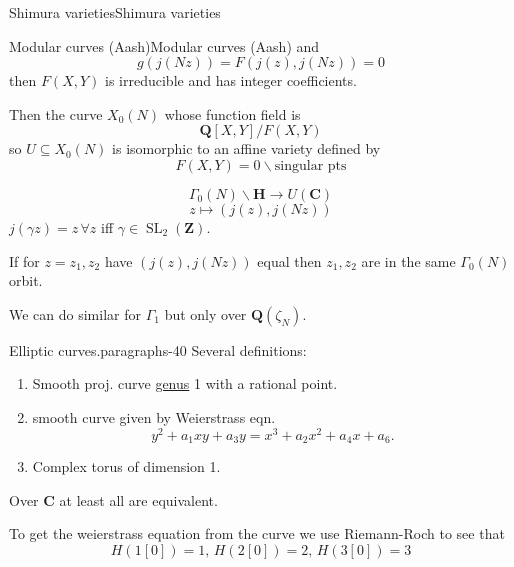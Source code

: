 \documentclass[10pt,]{book}
\numberwithin{equation}{section}
\newcommand{\lb}{[}
\newcommand{\rb}{]}
\newcommand{\ZZ}{\mathbf{Z}}
\newcommand{\QQ}{\mathbf{Q}}
\newcommand{\CC}{\mathbf{C}}
\newcommand{\HH}{\mathbf{H}}
\DeclareMathOperator{\SL}{SL}
\begin{document}
\begin{chapterptx}{Shimura varieties}{}{Shimura varieties}{}{}
\begin{sectionptx}{Modular curves (Aash)}{}{Modular curves (Aash)}{}{}
and%
\begin{equation*}
g (j(Nz)) = F(j(z), j(Nz)) = 0
\end{equation*}
then \(F(X,Y)\) is irreducible and  has integer coefficients.%
\par
\hypertarget{p-1043}{}%
Then the curve \(X_0(N)\) whose function field is%
\begin{equation*}
\QQ \lb X,Y\rb/ F(X,Y)
\end{equation*}
so \(U \subseteq X_0(N)\) is isomorphic to an affine variety defined by%
\begin{equation*}
F(X,Y) = 0 \smallsetminus \text{singular pts}
\end{equation*}
%
\par
\hypertarget{p-1044}{}%
%
\begin{equation*}
\Gamma_0(N) \backslash \HH \to U(\CC)
\end{equation*}
%
\begin{equation*}
z \mapsto (j(z), j(Nz))
\end{equation*}
\(j(\gamma z) = z\,\forall z\) iff \(\gamma \in \SL_2(\ZZ)\).%
\par
\hypertarget{p-1045}{}%
If for \(z= z_1,z_2\) have \((j(z),j(Nz))\) equal then \(z_1,z_2\) are in the same \(\Gamma_0(N)\) orbit.%
\par
\hypertarget{p-1046}{}%
We can do similar for \(\Gamma_1\) but only over \(\QQ(\zeta_N)\).%
\begin{paragraphs}{Elliptic curves.}{paragraphs-40}%
\hypertarget{p-1047}{}%
Several definitions:\leavevmode%
\begin{enumerate}
\item\hypertarget{li-260}{}Smooth proj. curve \hyperref[def-class-set]{genus} 1 with a rational point.%
\item\hypertarget{li-261}{}smooth curve given by Weierstrass eqn.%
\begin{equation*}
y^2 + a_1xy + a_3 y =  x^3 + a_2x^2 + a_4 x + a_6\text{.}
\end{equation*}
%
\item\hypertarget{li-262}{}Complex torus of  dimension 1.%
\end{enumerate}
%
\par
\hypertarget{p-1048}{}%
Over \(\CC\) at least all are equivalent.%
\par
\hypertarget{p-1049}{}%
To get the weierstrass equation from the curve we use Riemann-Roch to see that%
\begin{equation*}
H(1[0]) = 1,\, H(2[0]) = 2,\,H(3[0]) =3
\end{equation*}

\end{paragraphs}
\end{sectionptx}
\end{chapterptx}
\end{document}
